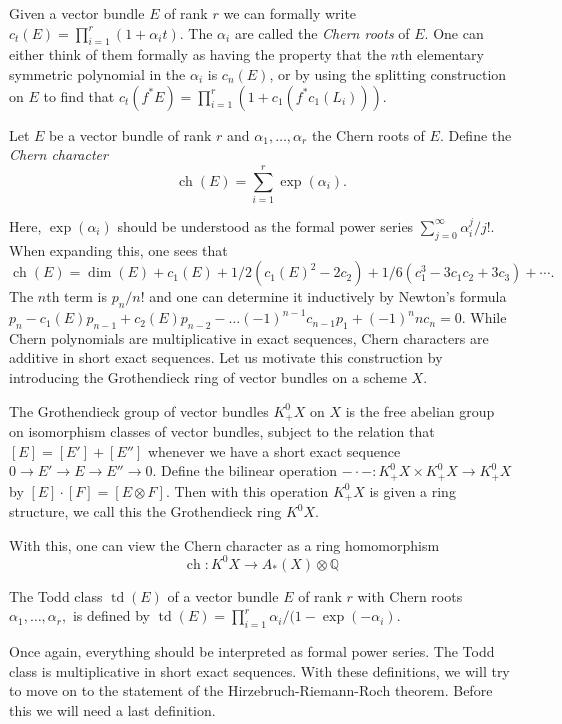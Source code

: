 \documentclass[a4paper,openany]{scrbook}
\begin{document}
Given a vector bundle $E$ of rank $r$ we can formally write $c_t(E) = \prod_{i=1}^r (1+\alpha_i t).$ The $\alpha_i$ are called the \emph{Chern roots}  of $E.$ One can either think of them formally as having the property that the $n$th elementary symmetric polynomial in the $\alpha_i$ is $c_n(E)$, or by using the splitting construction on $E$ to find that $c_t(f^\ast E) = \prod_{i=1}^r (1+c_1(f^\ast c_1(L_i)))$.

\begin{defn}
Let $E$ be a vector bundle of rank $r$ and $\alpha_1, \ldots, \alpha_r$ the Chern roots of $E.$ Define the \emph{Chern character} 
\[
\operatorname{ch}(E) = \sum_{i=1}^r \exp(\alpha_i).
\]
\end{defn}
Here, $\exp(\alpha_i)$ should be understood as the formal power series $\sum_{j=0}^\infty \alpha_i^j/j!$. When expanding this, one sees that $\operatorname{ch}(E) = \dim(E) + c_1(E) +1/2 (c_1(E)^2-2c_2) + 1/6(c^3_1-3c_1c_2+3c_3)+ \cdots.$  The $n$th term is $p_n/n!$ and one can determine it inductively by Newton's formula $p_n-c_1(E)p_{n-1}+c_2(E)p_{n-2} - \ldots (-1)^{n-1} c_{n-1}p_1+(-1)^n n c_n=0.$  While Chern polynomials are multiplicative in exact sequences, Chern characters are additive in short exact sequences. Let us motivate this construction by introducing the Grothendieck ring of vector bundles on a scheme $X$.

\begin{defn}
The Grothendieck group of vector bundles $K^0_+ X$ on $X$  is the free abelian group on isomorphism classes of vector bundles, subject to the relation that $[E] = [E']+[E'']$ whenever we have a short exact sequence $0 \to E' \to E \to E'' \to 0.$  Define the bilinear operation $- \cdot -:K^0_+X \times K^0_+ X \rightarrow K^0_+ X $ by  $[E]\cdot[F] = [E \otimes F].$ Then with this operation $K^0_+ X$ is given a ring structure, we call this the Grothendieck ring $K^0 X$. 
\end{defn}
With this, one can view the Chern character as a ring homomorphism
\[
\operatorname{ch}\colon K^0 X \rightarrow A_\ast(X) \otimes \mathbb{Q}
\]
\begin{defn}
The Todd class $\operatorname{td}(E)$ of a vector bundle $E$ of rank $r$ with Chern roots $\alpha_1 ,\ldots, \alpha_r,$ is defined by $\operatorname{td}(E) = \prod_{i=1}^r \alpha_i /(1 - \exp(-\alpha_i)$. 
\end{defn}
Once again, everything should be interpreted as formal power series. The Todd class is multiplicative in short exact sequences. With these definitions, we will try to move on to the statement of the Hirzebruch-Riemann-Roch theorem. Before this we will need a last definition.
\end{document}
